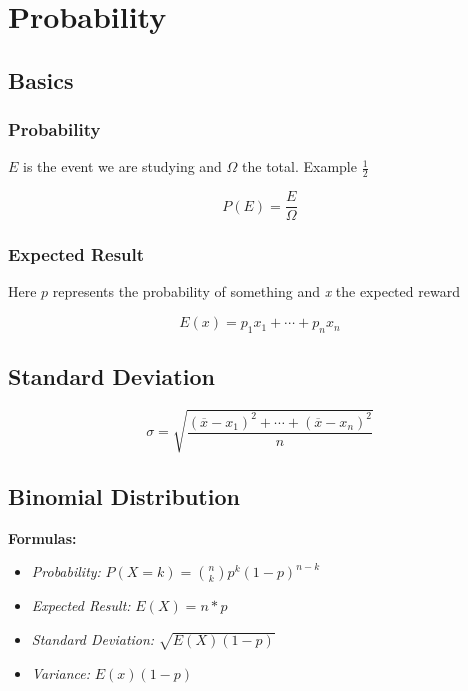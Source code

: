 \newpage
\section{Probability}

\subsection{Basics}

\subsubsection{Probability}

\(E\) is the event we are studying and \(\Omega\) the total. Example \(\frac{1}{2}\)

\[
    P(E) = \frac{E}{\Omega}
\]

\subsubsection{Expected Result}

Here \(p\) represents the probability of something and \emph{x} the expected reward

\[
    E(x) = p_1 x_1 + \cdots + p_n x_n
\]

\subsection{Standard Deviation}

\[
    \sigma = \sqrt{ \frac{ {(\overline{x} - x_1)}^2 + \cdots + {(\overline{x} - x_n)}^2 }{ n } }
\]


\subsection{Binomial Distribution}

\textbf{Formulas:}

\begin{itemize}

    \item \emph{Probability: } \(P(X = k) = \binom{n}{k} p^k {(1 - p)}^{n - k}\)

    \item \emph{Expected Result: } \(E(X) = n * p\)

    \item \emph{Standard Deviation: } \(\sqrt{E(X)(1-p)}\)

    \item  \emph{Variance: } \(E(x)(1-p)\)

\end{itemize}

